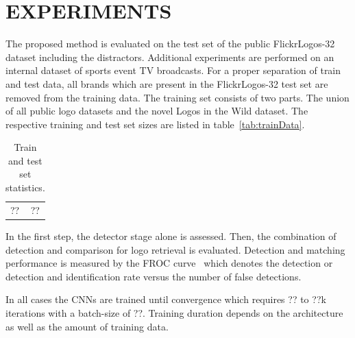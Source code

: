 \documentclass[a4paper,twoside]{article}
\begin{document}
\section{\uppercase{Experiments}}
%
\noindent The proposed method is evaluated on the test set of the public FlickrLogos-32 dataset including the distractors. Additional experiments are performed on an internal dataset of sports event TV broadcasts. For a proper separation of train and test data, all brands which are present in the FlickrLogos-32 test set are removed from the training data. The training set consists of two parts. The union of all public logo datasets and the novel Logos in the Wild dataset. The respective training and test set sizes are listed in table~\ref{tab:trainData}.
%
\begin{table}[t]
\centering
\begingroup	
\setlength{\tabcolsep}{6pt}
\caption{Train and test set statistics.}
\label{tab:trainTestStatistics}
\begin{small}
\begin{tabular}{l|c}
?? & ?? %
\end{tabular}
\end{small}
\endgroup
\end{table}

In the first step, the detector stage alone is assessed. Then, the combination of detection and comparison for logo retrieval is evaluated. 
Detection and matching performance is measured by the \ac{FROC} curve~\cite{miller1969} which denotes the detection or detection and identification rate versus the number of false detections.

In all cases the \acp{CNN} are trained until convergence which requires ?? to ??k iterations with a batch-size of ??. Training duration depends on the architecture as well as the amount of training data.
\end{document}
